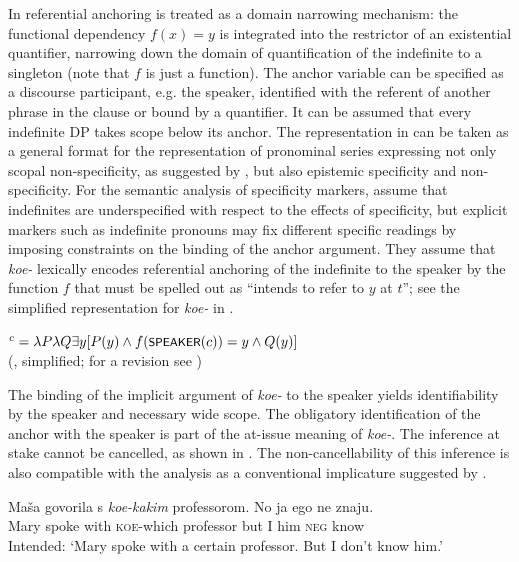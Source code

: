 \documentclass[output=paper,colorlinks,citecolor=brown]{langscibook}
\begin{document}
\noindent In  referential anchoring is treated as a domain narrowing mechanism: the functional dependency $f(x) = y$ is integrated into the restrictor of an existential quantifier, narrowing down the domain of quantification of the indefinite to a singleton (note that $f$ is just a function). The anchor variable can be specified as a discourse participant, e.g. the speaker, identified with the referent of another phrase in the clause or bound by a quantifier. It can be assumed that every indefinite DP takes scope below its anchor. The representation in  can be taken as a general format for the representation of pronominal series expressing not only scopal non-specificity, as suggested by \citet{Yanovich2005}, but also epistemic specificity and non-specificity. For the semantic analysis of specificity markers, \citeauthor{Onea.Geist2011} assume that indefinites are underspecified with respect to the effects of specificity, but explicit markers such as indefinite pronouns may fix different specific readings by imposing constraints on the binding of the anchor argument. They assume that \textit{koe-} lexically encodes referential anchoring of the indefinite to the speaker by the function $f$ that must be spelled out as “intends to refer to $y$ at $t$”; see the simplified representation for \textit{koe-} in .

\ea\label{geist:ex:onea-geist-koe}
$^c=\lambda P\lambda Q\exists y[P(y)\wedge f(\cnst{speaker}(c))=y\wedge Q(y)]$\\\hfill (\citealt[214]{Onea.Geist2011}, simplified; for a revision see )
\z

\noindent The binding of the implicit argument of \textit{koe-} to the speaker yields identifiability by the speaker and necessary wide scope. The obligatory identification of the anchor with the speaker is part of the at-issue meaning of \textit{koe-}. The inference at stake cannot be cancelled, as shown in . The non-cancellability of this inference is also compatible with the analysis as a conventional implicature suggested by \citet{Kagan2011}.

\ea\label{geist:ex:koe-anti-kagan}
\gll Maša govorila s \textit{koe-kakim} professorom. \minsp{\#} No ja ego ne znaju.\\
Mary spoke with \textsc{koe}-which professor {} but I him \textsc{neg} know\\
\glt Intended: ‘Mary spoke with a certain professor. But I don’t know him.’\\\hfill\citep[216]{Onea.Geist2011}
\z
\end{document}
